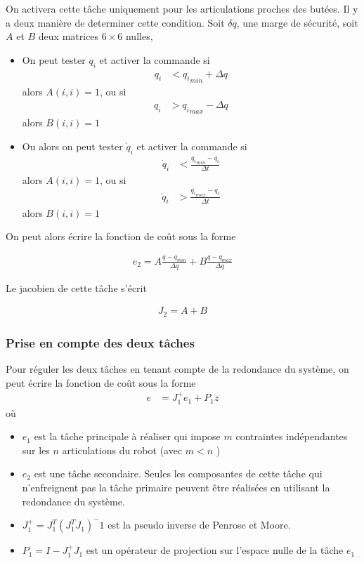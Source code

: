 \documentclass[a4paper, 10pt ]{article}
\begin{document}
On activera cette tâche uniquement pour les articulations proches des butées. Il y a deux manière de determiner cette condition. Soit $\delta q$, une marge de sécurité, soit $A$ et $B$ deux matrices $6\times6$ nulles,
\begin{itemize}
\item On peut tester $q_i$ et activer la commande si 
\begin{align}
q_i&<{q_i}_{min}+\Delta q
\end{align}
alors $A(i,i)=1$,  ou si 
 \begin{align}
 q_i&>{q_i}_{max}-\Delta q
\end{align}
alors  $B(i,i)=1$

\item Ou alors on peut tester $\dot{q}_i$ et activer la commande si 
\begin{align}
 \dot{q}_i  &<\frac{{q_i}_{min}-q_i}{\Delta t}
\end{align} 
alors $A(i,i)=1$,  ou si 
\begin{align}
\dot{q}_i  &>\frac{{q_i}_{max}-q_i}{\Delta t}
\end{align}
alors  $B(i,i)=1$
\end{itemize}

On peut alors écrire la fonction de coût sous la forme 

\begin{align}
e_2 = A\frac{q-q_{min}}{\Delta q} + B\frac{q-q_{max}}{\Delta q}
\end{align}


Le jacobien de cette tâche s'écrit 

\begin{align}
J_2 = A+B
\end{align}

\subsubsection{Prise en compte des deux tâches}
Pour réguler les deux tâches en tenant compte de la redondance du système, on peut écrire la fonction de coût sous la forme 
\begin{align}
e&=J_1^+e_1+P_1z
\end{align}
 \noindent où
 \begin{itemize}
 \item $e_1$ est la tâche principale à réaliser qui impose $m$ contraintes indépendantes sur les $n$ articulations du robot (avec $m<n$ )
 \item $e_2$ est une tâche secondaire. Seules les composantes de cette tâche qui n'enfreignent pas la tâche primaire peuvent être réalisées en utilisant la redondance du système.
 \item $J_1^+= J_1^T (J_1^T J_1)^-1$ est la pseudo inverse de Penrose et Moore.
 \item $P_1=I-J_1^+J_1$ est un opérateur de projection sur l'espace nulle de la tâche $e_1$
 \end{itemize}
\end{document}
